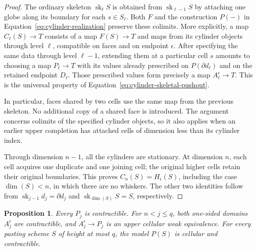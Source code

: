 \documentclass[11pt,letterpaper]{article}
\numberwithin{equation}{section}
\theoremstyle{plain}
\newtheorem{proposition}[theorem]{Proposition}
\theoremstyle{definition}
\theoremstyle{remark}
\begin{document}
\begin{proof}
The ordinary skeleton \(\operatorname{sk}_\ell S\) is obtained from
\(\operatorname{sk}_{\ell-1}S\) by attaching one globe along its boundary for
each \(s\in S_\ell\).  Both \(F\) and the construction
\(P(-)\) in Equation~\eqref{eq:cylinder-realization} preserve these
colimits.  More explicitly, a map \(C_\ell(S)\to T\) consists of
a map \(F(S)\to T\) and maps from its cylinder objects through
level \(\ell\), compatible on faces and on endpoint
\(\epsilon\).  After specifying the same data through level
\(\ell-1\), extending them at a particular cell \(s\) amounts
to choosing a map \(P_\ell\to T\) with its values already
prescribed on \(P(\partial d_\ell)\) and on the retained
endpoint \(D_\ell\).  Those prescribed values form precisely a
map \(A_\ell^\epsilon\to T\).  This is the universal property
of Equation~\eqref{eq:cylinder-skeletal-pushout}.

In particular, faces shared by two cells use the same map from the
previous skeleton.  No additional copy of a shared face is introduced.
The argument concerns colimits of the specified cylinder objects, so it
also applies when an earlier upper completion has attached cells of
dimension less than its cylinder index.

Through dimension \(n-1\), all the cylinders are stationary.  At
dimension \(n\), each cell acquires one duplicate and one joining
cell; the original higher cells retain their original boundaries.
This proves \(C_n(S)=H_\epsilon(S)\), including the case
\(\dim(S)<n\), in which there are no whiskers.  The other two
identities follow from \(\operatorname{sk}_{j-1}d_j=\partial d_j\) and
\(\operatorname{sk}_{\dim(S)}S=S\), respectively.
\end{proof}

\begin{proposition}\label{prop:cylinder-contractibility}
Every \(P_j\) is contractible.  For \(n<j\le q\), both
one-sided domains \(A_j^\epsilon\) are contractible, and
\(A_j^\epsilon\to P_j\) is an upper cellular weak equivalence.
For every pasting scheme \(S\) of height at most \(q\), the model
\(P(S)\) is cellular and contractible.
\end{proposition}
\end{document}
